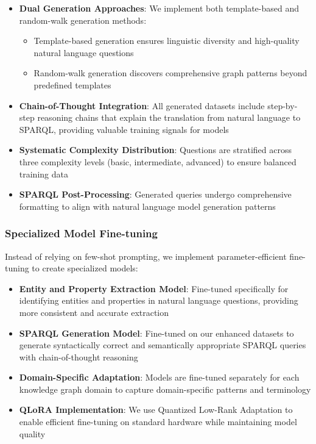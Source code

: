 \begin{itemize}
    \item \textbf{Dual Generation Approaches}: We implement both template-based and random-walk generation methods:
    \begin{itemize}
        \item Template-based generation ensures linguistic diversity and high-quality natural language questions
        \item Random-walk generation discovers comprehensive graph patterns beyond predefined templates
    \end{itemize}
    
    \item \textbf{Chain-of-Thought Integration}: All generated datasets include step-by-step reasoning chains that explain the translation from natural language to SPARQL, providing valuable training signals for models
    
    \item \textbf{Systematic Complexity Distribution}: Questions are stratified across three complexity levels (basic, intermediate, advanced) to ensure balanced training data
    
    \item \textbf{SPARQL Post-Processing}: Generated queries undergo comprehensive formatting to align with natural language model generation patterns
\end{itemize}

\subsubsection{Specialized Model Fine-tuning}

Instead of relying on few-shot prompting, we implement parameter-efficient fine-tuning to create specialized models:

\begin{itemize}
    \item \textbf{Entity and Property Extraction Model}: Fine-tuned specifically for identifying entities and properties in natural language questions, providing more consistent and accurate extraction
    
    \item \textbf{SPARQL Generation Model}: Fine-tuned on our enhanced datasets to generate syntactically correct and semantically appropriate SPARQL queries with chain-of-thought reasoning
    
    \item \textbf{Domain-Specific Adaptation}: Models are fine-tuned separately for each knowledge graph domain to capture domain-specific patterns and terminology
    
    \item \textbf{QLoRA Implementation}: We use Quantized Low-Rank Adaptation to enable efficient fine-tuning on standard hardware while maintaining model quality
\end{itemize}

